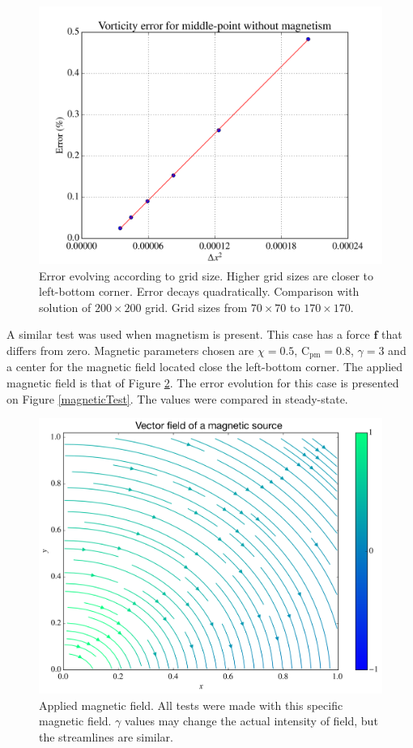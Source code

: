\documentclass[journal]{IEEEtran}
\begin{document}
\begin{figure}[!t]
\centering
\includegraphics[width=\linewidth]{figures/validateHydrodynamicsRe40}
\caption{Error evolving according to grid size. Higher grid sizes are closer to left-bottom corner. Error decays quadratically. Comparison with solution of $200\times 200$ grid. Grid sizes from $70\times 70$ to $170\times 170$. \label{hydrodynamicsTest}}
\end{figure}

A similar test was used when magnetism is present. This case has a force $\mathbf{f}$ that differs from zero. Magnetic parameters chosen are $\chi=0.5$, $\mathrm{C}_\mathrm{pm}=0.8$, $\gamma=3$ and a center for the magnetic field located close the left-bottom corner. The applied magnetic field is that of Figure \ref{magneticField}. The error evolution for this case is presented on Figure \ref{magneticTest}. The values were compared in steady-state.


\begin{figure}[!t]
\centering
\includegraphics[width=\linewidth]{figures/vectorFieldH}
\caption{Applied magnetic field. All tests were made with this specific magnetic field. $\gamma$ values may change the actual intensity of field, but the streamlines are similar.\label{magneticField}}
\end{figure}
\end{document}
